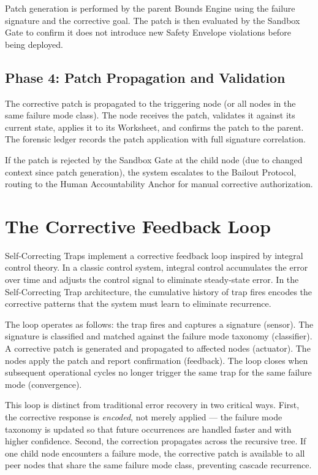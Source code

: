 \documentclass[12pt]{article}
\begin{document}
Patch generation is performed by the parent Bounds Engine using the failure signature and the corrective goal. The patch is then evaluated by the Sandbox Gate to confirm it does not introduce new Safety Envelope violations before being deployed.

\subsection{Phase 4: Patch Propagation and Validation}
The corrective patch is propagated to the triggering node (or all nodes in the same failure mode class). The node receives the patch, validates it against its current state, applies it to its Worksheet, and confirms the patch to the parent. The forensic ledger records the patch application with full signature correlation.

If the patch is rejected by the Sandbox Gate at the child node (due to changed context since patch generation), the system escalates to the Bailout Protocol, routing to the Human Accountability Anchor for manual corrective authorization.

\section{The Corrective Feedback Loop}
Self-Correcting Traps implement a corrective feedback loop inspired by integral control theory. In a classic control system, integral control accumulates the error over time and adjusts the control signal to eliminate steady-state error. In the Self-Correcting Trap architecture, the cumulative history of trap fires encodes the corrective patterns that the system must learn to eliminate recurrence.

The loop operates as follows: the trap fires and captures a signature (sensor). The signature is classified and matched against the failure mode taxonomy (classifier). A corrective patch is generated and propagated to affected nodes (actuator). The nodes apply the patch and report confirmation (feedback). The loop closes when subsequent operational cycles no longer trigger the same trap for the same failure mode (convergence).

This loop is distinct from traditional error recovery in two critical ways. First, the corrective response is \textit{encoded}, not merely applied --- the failure mode taxonomy is updated so that future occurrences are handled faster and with higher confidence. Second, the correction propagates across the recursive tree. If one child node encounters a failure mode, the corrective patch is available to all peer nodes that share the same failure mode class, preventing cascade recurrence.
\end{document}
